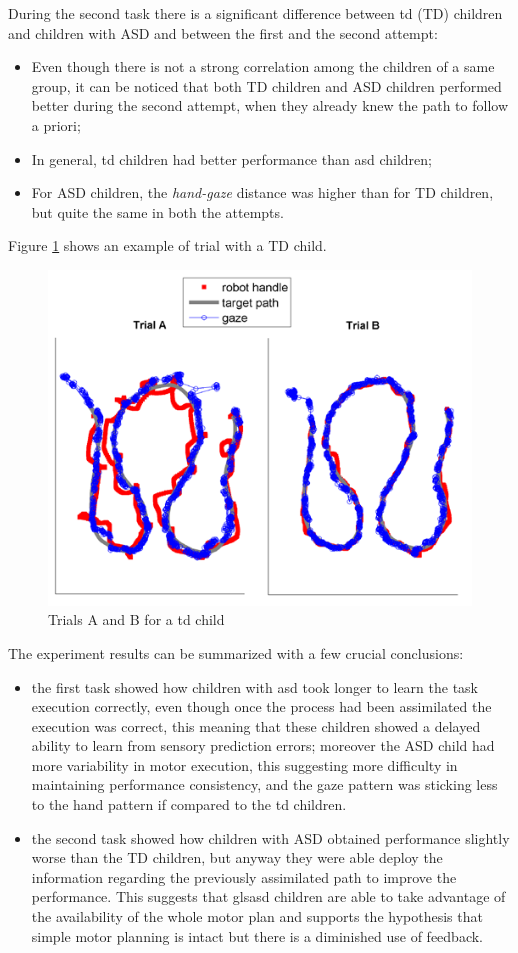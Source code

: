\documentclass[12pt,journal,draftclsnofoot,onecolumn]{IEEEtran}
\makeatletter
\let\origsubsubsection\subsubsection
\renewcommand\subsubsection{\@ifstar{\starsubsubsection}{\nostarsubsubsection}}
\newcommand\nostarsubsubsection[1]
{\subsubsectionprelude\origsubsubsection{#1}}
\newcommand\subsubsectionprelude{%
  \vspace{6pt}
}
\makeatother
\begin{document}
During the second task there is a significant difference between \gls{td} (TD) children and children with ASD and between the first and the second attempt:
\begin{itemize}
\item Even though there is not a strong correlation among the children of a same group, it can be noticed that both TD children and ASD children performed better during the second attempt, when they already knew the path to follow a priori;
\item In general, \gls{td} children had better performance than \gls{asd} children;
\item For ASD children, the \textit{hand-gaze} distance was higher than for TD children, but quite the same in both the attempts.
\end{itemize}

Figure \ref{path} shows an example of trial with a TD child.

\begin{figure}
\centering
\includegraphics[width = .55\textwidth]{path.png}
\caption{Trials A and B for a \gls{td} child}
\label{path}
\end{figure}

\subsubsection{summary observations}
\label{sec:summary}

The experiment results can be summarized with a few crucial conclusions:
\begin{itemize}
\item the first task showed how children with \gls{asd} took longer to learn the task execution correctly, even though once the process had been assimilated the execution was correct, this meaning that these children showed a delayed ability to learn from sensory prediction errors; moreover the ASD child had more variability in motor execution, this suggesting more difficulty in maintaining performance consistency, and the gaze pattern was sticking less to the hand pattern if compared to the \gls{td} children.
\item the second task showed how children with ASD obtained performance slightly worse than the TD children, but anyway they were able deploy the information regarding the previously assimilated path to improve the performance. This suggests that gls{asd} children are able to take advantage of the availability of the whole motor plan and supports the hypothesis that simple motor planning is intact but there is a diminished use of feedback.
\end{itemize}
\end{document}
